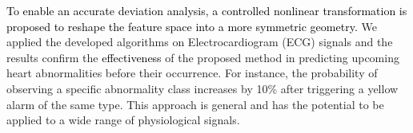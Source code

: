 \textcolor{black}{To enable an accurate deviation analysis, a controlled nonlinear transformation is proposed to reshape the feature space into a more symmetric geometry.} %
We applied the developed algorithms on Electrocardiogram (ECG) signals and the results confirm the \textcolor{black}{effectiveness} of the proposed method in predicting upcoming heart abnormalities before their occurrence. For instance, the probability of observing a specific abnormality class increases by 10\% after triggering a yellow alarm of the same type. This approach is general and has the potential to be applied to a wide range of physiological signals.


